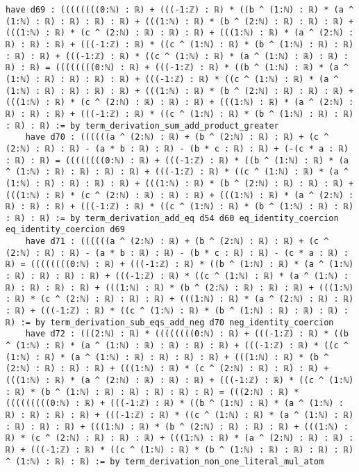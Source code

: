 \documentclass{article}
\begin{document}
\begin{tcolorbox}[colback=white!10, width=\linewidth]
\begin{lstlisting}[language=Lean4]
    have d69 : ((((((((0:ℕ) : ℝ) + (((-1:ℤ) : ℝ) * ((b ^ (1:ℕ) : ℝ) * (a ^ (1:ℕ) : ℝ) : ℝ) : ℝ) : ℝ) + (((1:ℕ) : ℝ) * (b ^ (2:ℕ) : ℝ) : ℝ) : ℝ) + (((1:ℕ) : ℝ) * (c ^ (2:ℕ) : ℝ) : ℝ) : ℝ) + (((1:ℕ) : ℝ) * (a ^ (2:ℕ) : ℝ) : ℝ) : ℝ) + (((-1:ℤ) : ℝ) * ((c ^ (1:ℕ) : ℝ) * (b ^ (1:ℕ) : ℝ) : ℝ) : ℝ) : ℝ) + (((-1:ℤ) : ℝ) * ((c ^ (1:ℕ) : ℝ) * (a ^ (1:ℕ) : ℝ) : ℝ) : ℝ) : ℝ) = ((((((((0:ℕ) : ℝ) + (((-1:ℤ) : ℝ) * ((b ^ (1:ℕ) : ℝ) * (a ^ (1:ℕ) : ℝ) : ℝ) : ℝ) : ℝ) + (((-1:ℤ) : ℝ) * ((c ^ (1:ℕ) : ℝ) * (a ^ (1:ℕ) : ℝ) : ℝ) : ℝ) : ℝ) + (((1:ℕ) : ℝ) * (b ^ (2:ℕ) : ℝ) : ℝ) : ℝ) + (((1:ℕ) : ℝ) * (c ^ (2:ℕ) : ℝ) : ℝ) : ℝ) + (((1:ℕ) : ℝ) * (a ^ (2:ℕ) : ℝ) : ℝ) : ℝ) + (((-1:ℤ) : ℝ) * ((c ^ (1:ℕ) : ℝ) * (b ^ (1:ℕ) : ℝ) : ℝ) : ℝ) : ℝ) := by term_derivation_sum_add_product_greater
    have d70 : ((((((a ^ (2:ℕ) : ℝ) + (b ^ (2:ℕ) : ℝ) : ℝ) + (c ^ (2:ℕ) : ℝ) : ℝ) - (a * b : ℝ) : ℝ) - (b * c : ℝ) : ℝ) + (-(c * a : ℝ) : ℝ) : ℝ) = ((((((((0:ℕ) : ℝ) + (((-1:ℤ) : ℝ) * ((b ^ (1:ℕ) : ℝ) * (a ^ (1:ℕ) : ℝ) : ℝ) : ℝ) : ℝ) + (((-1:ℤ) : ℝ) * ((c ^ (1:ℕ) : ℝ) * (a ^ (1:ℕ) : ℝ) : ℝ) : ℝ) : ℝ) + (((1:ℕ) : ℝ) * (b ^ (2:ℕ) : ℝ) : ℝ) : ℝ) + (((1:ℕ) : ℝ) * (c ^ (2:ℕ) : ℝ) : ℝ) : ℝ) + (((1:ℕ) : ℝ) * (a ^ (2:ℕ) : ℝ) : ℝ) : ℝ) + (((-1:ℤ) : ℝ) * ((c ^ (1:ℕ) : ℝ) * (b ^ (1:ℕ) : ℝ) : ℝ) : ℝ) : ℝ) := by term_derivation_add_eq d54 d60 eq_identity_coercion eq_identity_coercion d69
    have d71 : ((((((a ^ (2:ℕ) : ℝ) + (b ^ (2:ℕ) : ℝ) : ℝ) + (c ^ (2:ℕ) : ℝ) : ℝ) - (a * b : ℝ) : ℝ) - (b * c : ℝ) : ℝ) - (c * a : ℝ) : ℝ) = ((((((((0:ℕ) : ℝ) + (((-1:ℤ) : ℝ) * ((b ^ (1:ℕ) : ℝ) * (a ^ (1:ℕ) : ℝ) : ℝ) : ℝ) : ℝ) + (((-1:ℤ) : ℝ) * ((c ^ (1:ℕ) : ℝ) * (a ^ (1:ℕ) : ℝ) : ℝ) : ℝ) : ℝ) + (((1:ℕ) : ℝ) * (b ^ (2:ℕ) : ℝ) : ℝ) : ℝ) + (((1:ℕ) : ℝ) * (c ^ (2:ℕ) : ℝ) : ℝ) : ℝ) + (((1:ℕ) : ℝ) * (a ^ (2:ℕ) : ℝ) : ℝ) : ℝ) + (((-1:ℤ) : ℝ) * ((c ^ (1:ℕ) : ℝ) * (b ^ (1:ℕ) : ℝ) : ℝ) : ℝ) : ℝ) := by term_derivation_sub_eqs_add_neg d70 neg_identity_coercion
    have d72 : (((2:ℕ) : ℝ) * ((((((((0:ℕ) : ℝ) + (((-1:ℤ) : ℝ) * ((b ^ (1:ℕ) : ℝ) * (a ^ (1:ℕ) : ℝ) : ℝ) : ℝ) : ℝ) + (((-1:ℤ) : ℝ) * ((c ^ (1:ℕ) : ℝ) * (a ^ (1:ℕ) : ℝ) : ℝ) : ℝ) : ℝ) + (((1:ℕ) : ℝ) * (b ^ (2:ℕ) : ℝ) : ℝ) : ℝ) + (((1:ℕ) : ℝ) * (c ^ (2:ℕ) : ℝ) : ℝ) : ℝ) + (((1:ℕ) : ℝ) * (a ^ (2:ℕ) : ℝ) : ℝ) : ℝ) + (((-1:ℤ) : ℝ) * ((c ^ (1:ℕ) : ℝ) * (b ^ (1:ℕ) : ℝ) : ℝ) : ℝ) : ℝ) : ℝ) = (((2:ℕ) : ℝ) * (((((((((0:ℕ) : ℝ) + (((-1:ℤ) : ℝ) * ((b ^ (1:ℕ) : ℝ) * (a ^ (1:ℕ) : ℝ) : ℝ) : ℝ) : ℝ) + (((-1:ℤ) : ℝ) * ((c ^ (1:ℕ) : ℝ) * (a ^ (1:ℕ) : ℝ) : ℝ) : ℝ) : ℝ) + (((1:ℕ) : ℝ) * (b ^ (2:ℕ) : ℝ) : ℝ) : ℝ) + (((1:ℕ) : ℝ) * (c ^ (2:ℕ) : ℝ) : ℝ) : ℝ) + (((1:ℕ) : ℝ) * (a ^ (2:ℕ) : ℝ) : ℝ) : ℝ) + (((-1:ℤ) : ℝ) * ((c ^ (1:ℕ) : ℝ) * (b ^ (1:ℕ) : ℝ) : ℝ) : ℝ) : ℝ) ^ (1:ℕ) : ℝ) : ℝ) := by term_derivation_non_one_literal_mul_atom

\end{lstlisting}
\end{tcolorbox}
\end{document}
